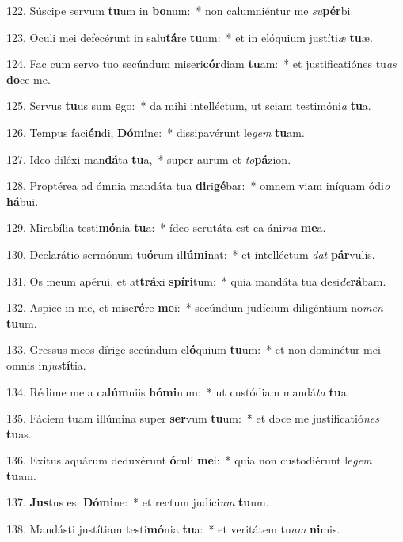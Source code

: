 122. Súscipe servum \textbf{tu}um in \textbf{bo}num:~*  non calumniéntur me \textit{su}\textbf{pér}bi.\

123. Oculi mei defecérunt in salu\textbf{tá}re \textbf{tu}um:~*  et in elóquium justíti\textit{æ} \textbf{tu}æ.\

124. Fac cum servo tuo secúndum miseri\textbf{cór}diam \textbf{tu}am:~*  et justificatiónes tu\textit{as} \textbf{do}ce me.\

125. Servus \textbf{tu}us sum \textbf{e}go:~*  da mihi intelléctum, ut sciam testimóni\textit{a} \textbf{tu}a.\

126. Tempus faci\textbf{én}di, \textbf{Dó}\textbf{mi}ne:~*  dissipavérunt le\textit{gem} \textbf{tu}am.\

127. Ideo diléxi man\textbf{dá}ta \textbf{tu}a,~*  super aurum et \textit{to}\textbf{pá}zion.\

128. Proptérea ad ómnia mandáta tua \textbf{di}ri\textbf{gé}bar:~*  omnem viam iníquam ódi\textit{o} \textbf{há}bui.\

129. Mirabília testi\textbf{mó}nia \textbf{tu}a:~*  ídeo scrutáta est ea áni\textit{ma} \textbf{me}a.\

130. Declarátio sermónum tu\textbf{ó}rum il\textbf{lú}\textbf{mi}nat:~*  et intelléctum \textit{dat} \textbf{pár}vulis.\

131. Os meum apérui, et at\textbf{trá}xi \textbf{spí}\textbf{ri}tum:~*  quia mandáta tua desi\textit{de}\textbf{rá}bam.\

132. Aspice in me, et mise\textbf{ré}re \textbf{me}i:~*  secúndum judícium diligéntium no\textit{men} \textbf{tu}um.\

133. Gressus meos dírige secúndum e\textbf{ló}quium \textbf{tu}um:~*  et non dominétur mei omnis in\textit{jus}\textbf{tí}tia.\

134. Rédime me a ca\textbf{lúm}niis \textbf{hó}\textbf{mi}num:~*  ut custódiam mandá\textit{ta} \textbf{tu}a.\

135. Fáciem tuam illúmina super \textbf{ser}vum \textbf{tu}um:~*  et doce me justificatió\textit{nes} \textbf{tu}as.\

136. Exitus aquárum deduxérunt \textbf{ó}culi \textbf{me}i:~*  quia non custodiérunt le\textit{gem} \textbf{tu}am.\

137. \textbf{Jus}tus es, \textbf{Dó}\textbf{mi}ne:~*  et rectum judíci\textit{um} \textbf{tu}um.\

138. Mandásti justítiam testi\textbf{mó}nia \textbf{tu}a:~*  et veritátem tu\textit{am} \textbf{ni}mis.\

